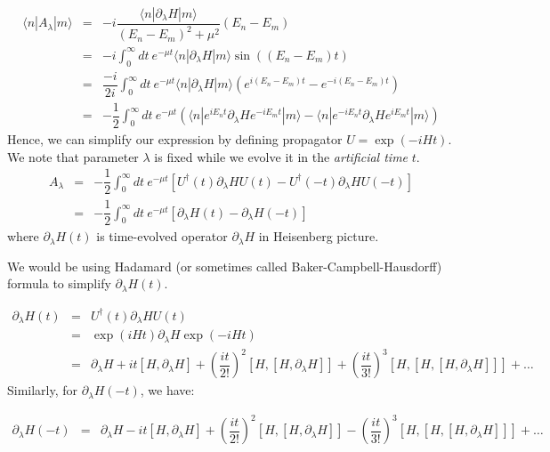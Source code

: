 \documentclass[11pt,a4paper]{article}
\begin{document}
\begin{eqnarray}
\langle n | A_{\lambda} | m \rangle &=&   -i \dfrac{\langle n | \partial_{\lambda}H  | m \rangle}{(E_n-E_m)^2 + \mu^2} (E_n-E_m) \\
&=& -i   \int^{\infty}_{0} dt\ e^{-\mu t} \langle n | \partial_{\lambda}H  | m \rangle \sin((E_n-E_m)t) \\
&=& \dfrac{-i }{2i}  \int^{\infty}_{0} dt\ e^{-\mu t} \langle n | \partial_{\lambda}H  | m \rangle \left( e^{i(E_n-E_m)t} - e^{-i(E_n-E_m)t} \right) \\
&=&- \dfrac{ 1}{2}  \int^{\infty}_{0} dt\ e^{-\mu t}  \left(  \langle n | e^{iE_nt} \partial_{\lambda}H   e^{-i E_m t} | m \rangle  -  \langle n |e^{-i E_n t}  \partial_{\lambda}H  e^{ i E_mt} | m \rangle  \right) 
\end{eqnarray}
Hence, we can simplify our expression by defining propagator  $U= \exp(-i H t)$. We note that parameter $\lambda$ is fixed while we evolve it in the \textit{artificial time} $t$.
\begin{eqnarray}
A_{\lambda} &=& -\dfrac{1}{2 }\int_0^{\infty} dt\ e^{-\mu t} [U^{\dagger}(t ) \partial_{\lambda} H U(t ) - U^{\dagger}(-t ) \partial_{\lambda}H U(-t )]  \\
&=& -\dfrac{1}{2 }\int_0^{\infty} dt\ e^{-\mu t} [ \partial_{\lambda} H (t) -  \partial_{\lambda}H (-t )  ]  
\end{eqnarray}
where $\partial_{\lambda}H (t)$ is time-evolved operator $\partial_{\lambda}H$ in Heisenberg picture.

We would be using  Hadamard (or sometimes called Baker-Campbell-Hausdorff) formula to simplify $\partial_{\lambda}H (t)$.

\begin{eqnarray}
\partial_{\lambda}H (t) &=& U^{\dagger}(t ) \partial_{\lambda} H U(t ) \\
&=& \exp(i H t) \partial_{\lambda} H \exp(-i H t)  \\
&=&  \partial_{\lambda} H  + it [H, \partial_{\lambda} H] + \left(\dfrac{i t}{  2! }\right)^2[H,[H, \partial_{\lambda} H]]  + \left(\dfrac{i t}{  3! }\right)^3 [H,[H,[H, \partial_{\lambda} H]]]   + \ldots
\end{eqnarray}
Similarly,  for $\partial_{\lambda}H (-t)$, we have:

\begin{eqnarray}
\partial_{\lambda}H (-t) &=&  \partial_{\lambda} H  - i t [H, \partial_{\lambda} H] + \left(\dfrac{i t}{ 2!}\right)^2 [H,[H, \partial_{\lambda} H]]  - \left(\dfrac{i t}{  3! }\right)^3 [H,[H,[H, \partial_{\lambda} H]]]   + \ldots
\end{eqnarray}
\end{document}
